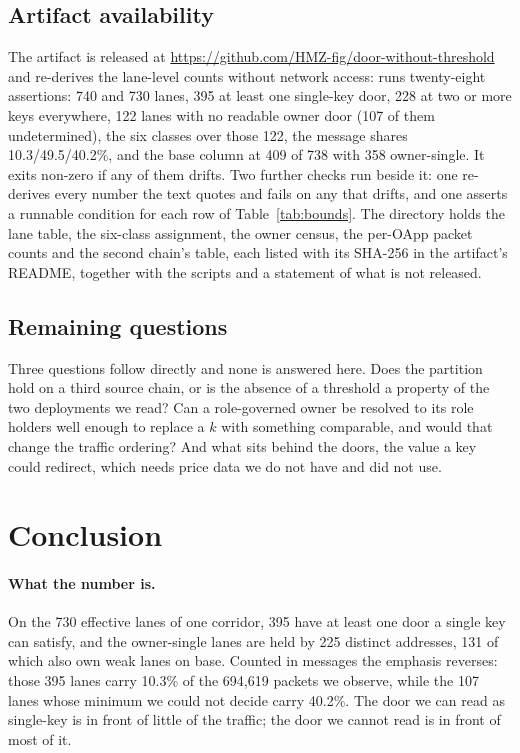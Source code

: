 \documentclass[10pt,a4paper]{article}
\newcommand{\code}[1]{\texttt{\detokenize{#1}}}
\begin{document}
\subsection{Artifact availability}
The artifact is released at \url{https://github.com/HMZ-fig/door-without-threshold} and re-derives the lane-level counts without network access:
\code{python3 code/reproduce.py} runs twenty-eight assertions: 740 and 730 lanes, 395 at least one
single-key door, 228 at two or more keys everywhere, 122 lanes with no readable owner door (107 of them
undetermined), the six classes over those 122, the
message shares 10.3/49.5/40.2\%, and the base column at 409 of 738 with 358 owner-single. It exits non-zero if any of them drifts. Two further
checks run beside it: one re-derives every number the text quotes and fails on any that drifts, and
one asserts a runnable condition for each row of Table~\ref{tab:bounds}. The directory holds the lane table, the six-class assignment, the owner
census, the per-OApp packet counts and the second chain's table, each listed with its SHA-256 in the
artifact's README, together with the scripts and a statement of what is not released.

\subsection{Remaining questions}
Three questions follow directly and none is answered here. Does the partition hold on a third source
chain, or is the absence of a threshold a property of the two deployments we read? Can a role-governed
owner be resolved to its role holders well enough to replace a $k$ with something comparable, and would
that change the traffic ordering? And what sits behind the doors, the value a key could redirect,
which needs price data we do not have and did not use.

\section{Conclusion}

\paragraph{What the number is.}
On the 730 effective lanes of one corridor, 395 have at least one door a single key can satisfy, and the owner-single lanes are held by 225 distinct addresses, 131 of which also own weak lanes on base. Counted in
messages the emphasis reverses: those 395 lanes carry 10.3\% of the 694,619 packets we observe, while the
107 lanes whose minimum we could not decide carry 40.2\%. The door we can read as single-key is in front of
little of the traffic; the door we cannot read is in front of most of it.
\end{document}
